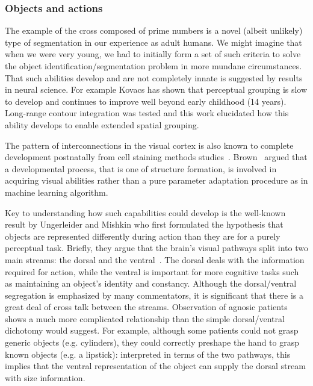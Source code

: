 \subsubsection*{Objects and actions}

The example of the cross composed of prime numbers is a novel (albeit
unlikely) type of segmentation in our experience as adult humans.  We
might imagine that when we were very young, we had to initially form a
set of such criteria to solve the object identification/segmentation
problem in more mundane circumstances.  That such abilities develop
and are not completely innate is suggested by results in neural
science. For example Kovacs \cite{kovacs00human} has shown that
perceptual grouping is slow to develop and continues
to improve well beyond early
childhood (14 years). Long-range contour integration was tested and
this work elucidated how this ability develops to enable extended
spatial grouping.  

\ifverbose
The pattern of interconnections in the visual cortex is also known
to complete development postnatally from cell staining methods
studies~\cite{burkhalter93development,callaway92development}.
Brown~\cite{brown94vision} argued that a developmental process, that
is one of structure formation, is involved in acquiring visual
abilities rather than a pure parameter adaptation procedure as in
machine learning algorithm.
\fi

Key to understanding how such capabilities could develop is the
well-known result by Ungerleider and Mishkin \cite{ungerleider82two}
who first formulated the hypothesis that objects are represented
differently during action than they are for a purely perceptual task.
Briefly, they argue that the brain's visual pathways split into two
main streams: the dorsal and the ventral~\cite{milner95visual}. The
dorsal deals with the information required for action, while the
ventral is important for more cognitive tasks such as maintaining an
object's identity and constancy.  Although the dorsal/ventral
segregation is emphasized by many commentators, it is significant that
there is a great deal of cross talk between the streams.  Observation
of agnosic patients \cite{jeannerod97cognitive} shows a much more
complicated relationship than the simple dorsal/ventral dichotomy
would suggest.  For example, although some patients could not grasp
generic objects (e.g.  cylinders), they could correctly preshape the
hand to grasp known objects (e.g. a lipstick): interpreted in terms of
the two pathways, this implies that the ventral representation of the
object can supply the dorsal stream with size information.

